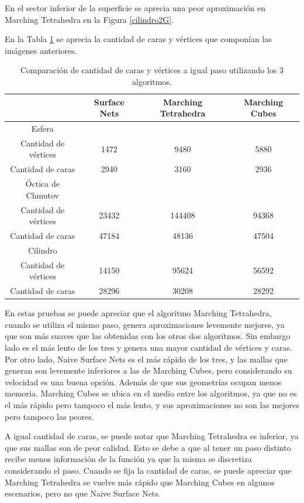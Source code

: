 \documentclass[12pt]{article}
\begin{document}
En el sector inferior de la superficie se aprecia una peor aproximación en Marching Tetrahedra en la Figura \ref{cilindro2G}.

En la Tabla \ref{cii} se aprecia la cantidad de caras y vértices que componían las imágenes anteriores.

\begin{table}[h!]
  \centering
  \begin{tabular}{cccc}
    \toprule
    & Surface Nets & Marching Tetrahedra & Marching Cubes\\
    \midrule
    Esfera&&&\\
    Cantidad de vértices & 1472 & 9480  & 5880 \\
    Cantidad de caras &  2940 & 3160 & 2936 \\
\hline
     Óctica de Chmutov&&&\\
    Cantidad de vértices & 23432 & 144408  & 94368 \\
    Cantidad de caras &  47184 & 48136 & 47504 \\
\hline
     Cilindro&&&\\
    Cantidad de vértices & 14150 &  95624 & 56592 \\
    Cantidad de caras &  28296 & 30208 & 28292 \\
\bottomrule
  \end{tabular}
  \caption{Comparación de cantidad de caras y vértices a igual paso utilizando los 3 algoritmos.}
  \label{cii}
\end{table}

En estas pruebas se puede apreciar que el algoritmo Marching Tetrahedra, cuando se utiliza el mismo paso, genera aproximaciones levemente mejores, ya que son más suaves que las obtenidas con los otros dos algoritmos. Sin embargo lado es el más lento de los tres y genera una mayor cantidad de vértices y caras. Por otro lado, Naive Surface Nets es el más rápido de los tres, y las mallas que generan son levemente inferiores a las de Marching Cubes, pero considerando su velocidad es una buena opción. Además de que sus geometrías ocupan menos memoria. Marching Cubes se ubica en el medio entre los algoritmos, ya que no es el más rápido pero tampoco el más lento, y sus aproximaciones no son las mejores pero tampoco las peores.

A igual cantidad de caras, se puede notar que Marching Tetrahedra es inferior, ya que sus mallas son de peor calidad. Esto se debe a que al tener un paso distinto recibe menos información de la función ya que la misma se discretiza considerando el paso. Cuando se fija la cantidad de caras, se puede apreciar que Marching Tetrahedra se vuelve más rápido que Marching Cubes en algunos escenarios, pero no que Naive Surface Nets.
\end{document}
